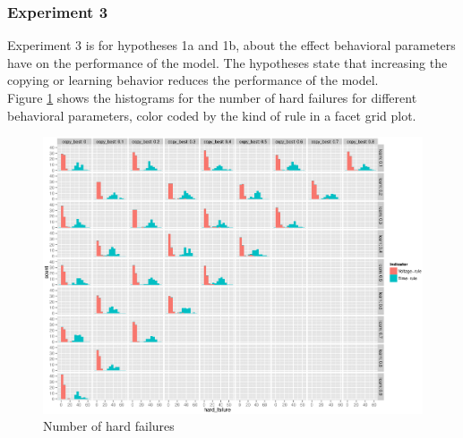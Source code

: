\documentclass[a4paper]{article}
\begin{document}
\subsubsection{Experiment 3}
Experiment 3 is for hypotheses 1a and 1b, about the effect behavioral parameters have on the performance of the model. 
The hypotheses state that increasing the copying or learning behavior reduces the performance of the model.\\
Figure \ref{colored_3} shows the histograms for the number of hard failures  for different behavioral parameters, 
color coded by the kind of rule in a facet grid plot. 
\begin{figure}[!ht]
\includegraphics[width = \textwidth]{hard_colored_c.eps}
\caption{Number of hard failures}
\label{colored_3}
\end{figure}\\
\end{document}
